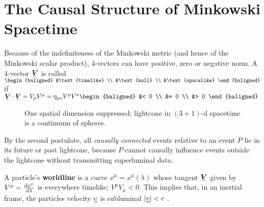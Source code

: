 \section{The Causal Structure of Minkowski Spacetime}

Because of the indefiniteness of the Minkowski metric (and hence of the Minkowski scalar product), 4-vectors can have positive, zero or negative norm.
A 4-vector $\ts V$ is called
\begin{math}
	\begin{baligned}
		&\text{timelike}
	\\	&\text{null}
	\\	&\text{spacelike}
	\end{baligned}
\end{math}
if 
\begin{math}
	\ts V \cdot \ts V = V_\mu V^\mu = \eta_{\mu\nu}V^\mu V^\nu
	\begin{baligned}
		&< 0
	\\	&= 0
	\\	&> 0
	\end{baligned}
.\end{math}

\begin{wrapfigure}[16]{l}{6cm}
	
	\caption*{One spatial dimension suppressed; lightcone in $(3+1)$-d spacetime is a continuum of spheres.}
\end{wrapfigure}
By the second postulate, all \emph{causally connected} events relative to an event $P$ lie in its future or past lightcone, because $P$ cannot causally influence events outside the lightcone without transmitting superluminal data.

A particle's \textbf{worldline} is a curve $x^\mu = x^\mu(\lambda)$ whose tangent $\ts V$ given by $V^\mu = \dv{x^\mu}{\lambda}$ is everywhere timelike; $V^\mu V_\mu < 0$.
This implies that, in an inertial frame, the particles velocity $\uvec v$ is subluminal $|\uvec v| < c$ \exercise.


